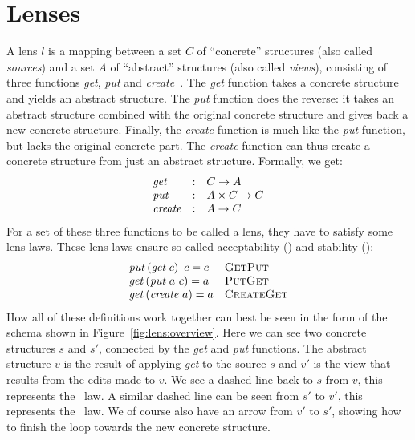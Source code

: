 \section{Lenses}\label{sec:background:lenses}
A lens \(l\) is a mapping between a set \(C\) of ``concrete''
structures (also called \emph{sources}) and a set \(A\) of ``abstract'' structures 
(also called \emph{views}), consisting of
three functions \emph{get}, \emph{put} and \emph{create}~\cite{foster2007}. The \emph{get}
function takes a concrete structure and yields an abstract structure. The
\emph{put} function does the reverse: it takes an abstract structure combined
with the original concrete structure and gives back a new concrete structure.
Finally, the \emph{create} function is much like the \emph{put} function, but
lacks the original concrete part. The \emph{create} function can thus create
a concrete structure from just an abstract structure. Formally, we get:
\[
  \begin{array}{lll}
    \textit{get} & : & C \rightarrow A \\
    \textit{put} & : & A \times C \rightarrow C \\
    \textit{create} & : & A \rightarrow C
  \end{array}
\]
For a set of these three functions to be called a lens, they have to satisfy some
lens laws. These lens laws ensure so-called acceptability (\putget)
and stability (\getput):
\[
  \begin{array}{ll}
    \mathit{put}\left(\textit{get}~c\right)~c = c & \textsc{GetPut} \\
    \mathit{get}\left(\textit{put}~a~c\right) = a & \textsc{PutGet} \\
    \mathit{get}\left(\textit{create}~a\right) = a & \textsc{CreateGet}
  \end{array}
\]
How all of these definitions work together can best be seen in the form of
the schema shown in Figure~\ref{fig:lens:overview}. Here we can see two
concrete structures $s$ and $s'$, connected by the \emph{get} and \emph{put} functions.
The abstract structure $v$ is the result of applying \emph{get} to the source $s$ and $v'$
is the view that results from the edits made to $v$. We see a dashed line back
to $s$ from $v$, this represents the \getput~law. A similar dashed line can be
seen from $s'$ to $v'$, this represents the \putget~law. We of course also have
an arrow from $v'$ to $s'$, showing how to finish the loop towards the new
concrete structure.

